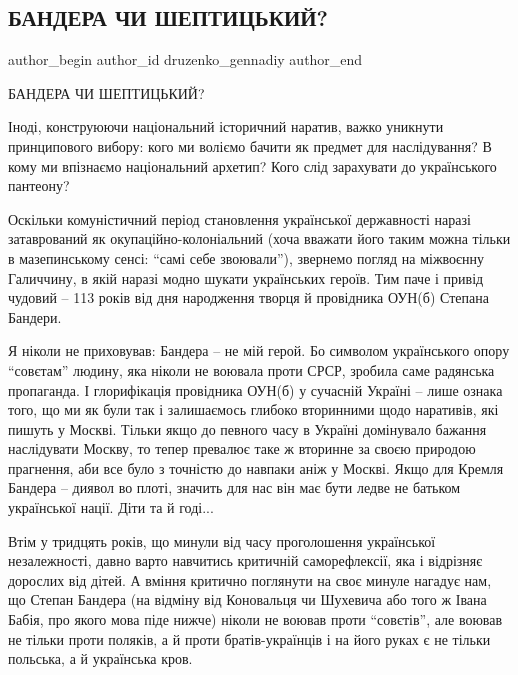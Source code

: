  
 
 
 
 
 
\subsection{БАНДЕРА ЧИ ШЕПТИЦЬКИЙ?}
\label{sec:01_01_2022.fb.druzenko_gennadiy.1.bandera_chy_sheptyckij}
 
\ifcmt
 author_begin
   author_id druzenko_gennadiy
 author_end
\fi

БАНДЕРА ЧИ ШЕПТИЦЬКИЙ?

Іноді, конструюючи національний історичний наратив, важко уникнути принципового
вибору: кого ми воліємо бачити як предмет для наслідування? В кому ми впізнаємо
національний архетип? Кого слід зарахувати до українського пантеону?

Оскільки комуністичний період становлення української державності наразі
затаврований як окупаційно-колоніальний (хоча вважати його таким можна тільки в
мазепинському сенсі: \enquote{самі себе звоювали}), звернемо погляд на міжвоєнну
Галиччину, в якій наразі модно шукати українських героїв. Тим паче і привід
чудовий – 113 років від дня народження творця й провідника ОУН(б) Степана
Бандери.

Я ніколи не приховував: Бандера – не мій герой. Бо символом українського опору
\enquote{совєтам} людину, яка ніколи не воювала проти СРСР, зробила саме радянська
пропаганда. І глорифікація провідника ОУН(б) у сучасній Україні – лише ознака
того, що ми як були так і залишаємось глибоко вторинними щодо наративів, які
пишуть у Москві. Тільки якщо до певного часу в Україні домінувало бажання
наслідувати Москву, то тепер превалює таке ж вторинне за своєю природою
прагнення, аби все було з точністю до навпаки аніж у Москві. Якщо для Кремля
Бандера – диявол во плоті, значить для нас він має бути ледве не батьком
української нації. Діти та й годі...

Втім у тридцять років, що минули від часу проголошення української
незалежності, давно варто навчитись критичній саморефлексії, яка і відрізняє
дорослих від дітей. А вміння критично поглянути на своє минуле нагадує нам, що
Степан Бандера (на відміну від Коновальця чи Шухевича або того ж Івана Бабія,
про якого мова піде нижче) ніколи не воював проти \enquote{совєтів}, але воював не
тільки проти поляків, а й проти братів-українців і на його руках є не тільки
польська, а й українська кров.

